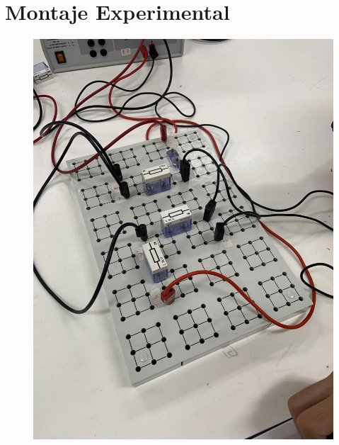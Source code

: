 \documentclass[twocolumn, 12pt]{article}
\begin{document}
\section{Montaje Experimental}

\begin{figure}[H]
    \centering
    \includegraphics[width = 0.9\linewidth]{./Images/Imagen3.jpeg}
\end{figure}
\end{document}
